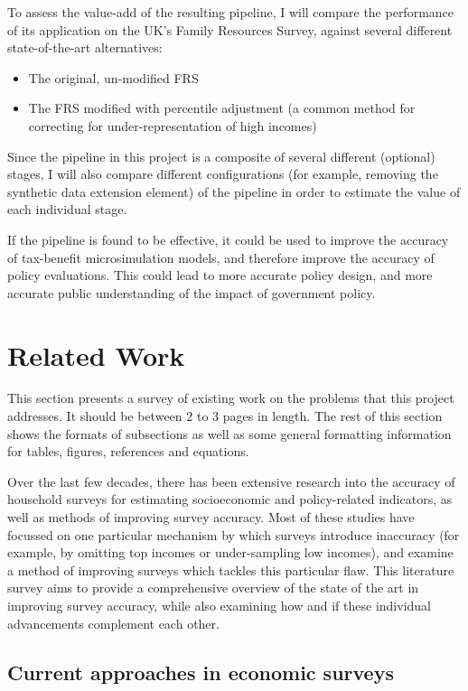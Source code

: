\documentclass[10pt,journal,compsoc]{IEEEtran}
\begin{document}
To assess the value-add of the resulting pipeline, I will compare the performance of its application on the UK's Family Resources Survey, against several different state-of-the-art alternatives:

\begin{itemize}
  \item The original, un-modified FRS
  \item The FRS modified with percentile adjustment (a common method for correcting for under-representation of high incomes)
\end{itemize}

Since the pipeline in this project is a composite of several different (optional) stages, I will also compare different configurations (for example, removing the synthetic data extension element) of the pipeline in order to estimate the value of each individual stage.

If the pipeline is found to be effective, it could be used to improve the accuracy of tax-benefit microsimulation models, and therefore improve the accuracy of policy evaluations. This could lead to more accurate policy design, and more accurate public understanding of the impact of government policy.

\section{Related Work}
This section presents a survey of existing work on the problems that this project addresses. It should be between 2 to 3 pages in length. The rest of this section shows the formats of subsections as well as some general formatting information for tables, figures, references and equations.

Over the last few decades, there has been extensive research into the accuracy of household surveys for estimating socioeconomic and policy-related indicators, as well as methods of improving survey accuracy. Most of these studies have focussed on one particular mechanism by which surveys introduce inaccuracy (for example, by omitting top incomes or under-sampling low incomes), and examine a method of improving surveys which tackles this particular flaw. This literature survey aims to provide a comprehensive overview of the state of the art in improving survey accuracy, while also examining how and if these individual advancements complement each other.

\subsection{Current approaches in economic surveys}
\end{document}
